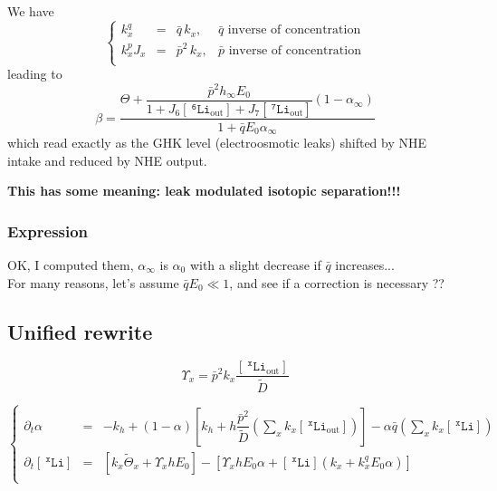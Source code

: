 \documentclass[aps,onecolumn,12pt]{revtex4}
\newcommand{\mychem}[1]{\mathtt{#1}}
\newcommand{\myconc}[1]{\left\lbrack{#1}\right\rbrack}
\newcommand{\spLi}[1]{{~^{\mychem{#1}}\mychem{Li}}}
\newcommand{\Li}[1]{\myconc{\spLi{#1}}}
\newcommand{\spLiOut}[1]{{\spLi{#1}}_{\mathrm{out}}}
\newcommand{\LiOut}[1]{\myconc{\spLiOut{#1}}}
\begin{document}
We have
\begin{equation}
\left\lbrace
	\begin{array}{rcll}
	k_x^q    & = & \bar{q}\,k_x,  &  \bar{q}\text{ inverse of concentration}\\
	k_x^pJ_x & = & \bar{p}^2\,k_x, & \bar{p}\text{ inverse of concentration}\\
	\end{array}
\right.
\end{equation}
leading to
\begin{equation}
	\label{steady_beta}
	\beta = \dfrac{\Theta+\dfrac{\bar{p}^2 h_\infty E_0}{1+J_6\LiOut{6}+J_7\LiOut{7}} \left(1-\alpha_\infty\right)}{1+\bar{q}E_0\alpha_\infty}
\end{equation}
which read exactly as the GHK level (electroosmotic leaks) shifted by NHE intake and reduced by NHE output.

\centerline{\bf This has some meaning: leak modulated isotopic separation!!!}


\subsubsection{Expression}
OK, I computed them, $\alpha_\infty$ is $\alpha_0$ with a slight decrease if $\bar{q}$ increases...\\
For many reasons, let's assume $\bar{q}E_0\ll 1$, and see if a correction is necessary ??

\subsection{Unified rewrite}
\begin{equation}
	\Upsilon_x = \bar{p}^2 k_x \dfrac{\LiOut{x}}{\tilde{D}}
\end{equation}

\begin{equation}
\boxed{
\left\lbrace
	\begin{array}{rcl}
		\partial_t\alpha    & = & 
		-k_h 
		+ \left(1-\alpha\right) \left[ k_h + h \dfrac{\bar{p}^2}{\tilde{D}} \left(\sum_x k_x \LiOut{x}\right) \right]
		- \alpha \bar{q} \left( {\sum_x k_x \Li{x}} \right)\\
		\partial_t\Li{x} & = & \left\lbrack k_x\tilde{\Theta}_x+\Upsilon_x h  E_0\right\rbrack
		-\left\lbrack
			\Upsilon_x h  E_0\alpha +  \Li{x}  \left(k_x + k_x^q E_0\alpha\right)
		\right\rbrack\\
	\end{array}
\right.
}
\end{equation}
\end{document}
